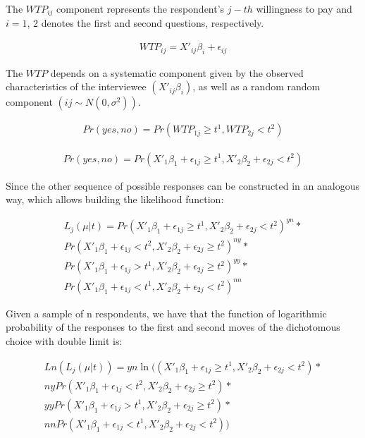 \documentclass[
]{article}
\begin{document}
The \(WTP_{ij}\) component represents the respondent's \(j-th\)
willingness to pay and \(i = 1\), 2 denotes the first and second
questions, respectively.

\begin{align}
WTP_{ij} = X'_{ij}\beta_{i} + \epsilon_{ij}
\end{align}

The \(WTP\) depends on a systematic component given by the observed
characteristics of the interviewee \((X'_{ij}\beta_{i})\), as well as a
random random component \((ij \sim N(0, \sigma^2))\).

\begin{align}
Pr(yes, no) = Pr(WTP_{1j} \ge t^1, WTP_{2j} < t^2)
\end{align}

\begin{align}
Pr(yes, no) = Pr(X'_{1}\beta_{1} + \epsilon_{1j} \ge t^1, X'_{2}\beta_{2} + \epsilon_{2j} < t^2)
\end{align}

Since the other sequence of possible responses can be constructed in an
analogous way, which allows building the likelihood function:

\[
\begin{aligned}
L_{j} (\mu | t) = Pr(X'_{1}\beta_{1} + \epsilon_{1j} \ge t^1, X'_{2}\beta_{2} + \epsilon_{2j} < t^2)^{yn} * \\
Pr(X'_{1}\beta_{1} + \epsilon_{1j} < t^2 , X'_{2}\beta_{2} + \epsilon_{2j} \ge t^2)^{ny} * \\
Pr(X'_{1}\beta_{1} + \epsilon_{1j} > t^1, X'_{2}\beta_{2} + \epsilon_{2j} \ge t^2)^{yy} * \\ 
Pr(X'_{1}\beta_{1} + \epsilon_{1j} < t^1, X'_{2}\beta_{2} + \epsilon_{2j} < t^2)^{nn} 
\end{aligned}
\]

Given a sample of n respondents, we have that the function of
logarithmic probability of the responses to the first and second moves
of the dichotomous choice with double limit is:

\[
\begin{aligned}
Ln(L_{j} (\mu | t)) = yn \ln((X'_{1}\beta_{1} + \epsilon_{1j} \ge t^1, X'_{2}\beta_{2} + \epsilon_{2j} < t^2) * \\
ny Pr(X'_{1}\beta_{1} + \epsilon_{1j} < t^2 , X'_{2}\beta_{2} + \epsilon_{2j} \ge t^2) * \\
yy Pr(X'_{1}\beta_{1} + \epsilon_{1j} > t^1, X'_{2}\beta_{2} + \epsilon_{2j} \ge t^2) * \\
nn Pr(X'_{1}\beta_{1} + \epsilon_{1j} < t^1, X'_{2}\beta_{2} + \epsilon_{2j} < t^2)) 
\end{aligned}
\]
\end{document}
